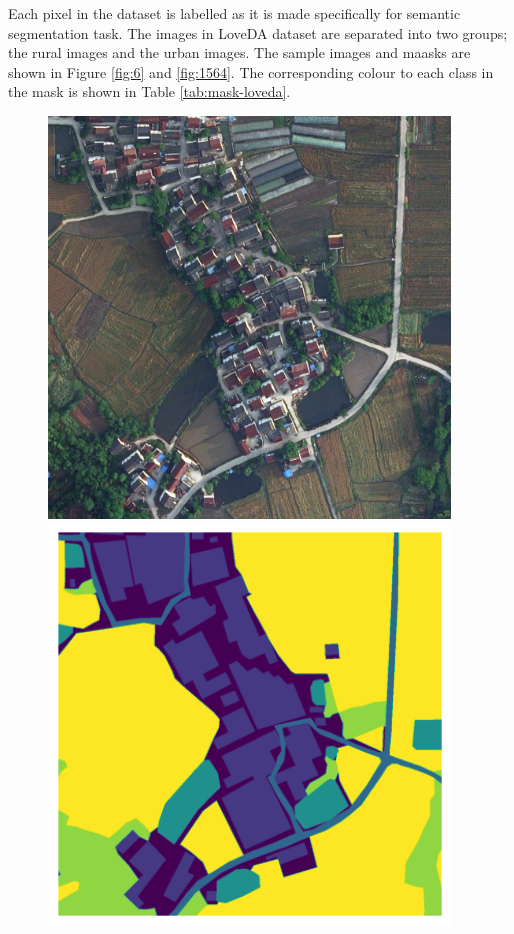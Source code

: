 Each pixel in the dataset is labelled as it is made specifically for semantic segmentation task. The images in LoveDA dataset are separated into two groups; the rural images and the urban images. The sample images and maasks are shown in Figure \ref{fig:6} and \ref{fig:1564}. The corresponding colour to each class in the mask is shown in Table \ref{tab:mask-loveda}. 
\FloatBarrier
\begin{figure}[!htb]
    \centering
    \begin{minipage}{0.5\textwidth}
        \centering
        \includegraphics[width=0.95\textwidth, height=0.35\textheight]{images/6.png}
    \end{minipage}\hfill
    \begin{minipage}{0.5\textwidth}
        \centering
        \includegraphics[width=0.95\textwidth, height=0.35\textheight]{images/mask-rural-6.png}

\end{minipage}
\end{figure}

